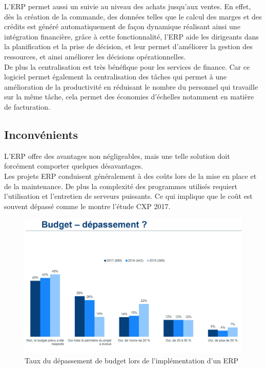         L’ERP permet aussi un suivie au niveau des achats jusqu’aux ventes. En effet, dès la création de la commande, des données telles que le calcul des marges et des crédits est généré automatiquement de façon dynamique réalisant ainsi une intégration financière, grâce à cette fonctionnalité, l’ERP aide les dirigeants dans la planification et la prise de décision, et leur permet d’améliorer la gestion des ressources, et ainsi améliorer les décisions opérationnelles.\\

        De plus la centralisation est très bénéfique pour les services de finance. Car ce logiciel permet également la centralisation des tâches qui permet à une amélioration de la productivité en réduisant le nombre du personnel qui travaille sur la même tâche, cela permet des économies d’échelles notamment en matière de facturation.

    \subsection{Inconvénients}
        L’ERP offre des avantages non négligeables, mais une telle solution doit forcément comporter quelques désavantages.\\

        Les projets ERP conduisent généralement à des coûts lors de la mise en place et de la maintenance. De plus la complexité des programmes utilisés requiert l’utilisation et l’entretien de serveurs puissants. Ce qui implique que le coût est souvent dépassé comme le montre l’étude CXP 2017.\\

        \begin{figure}[H]
            \centering
                \includegraphics[scale=0.4]{chapitre2/graph-depassement-budget.jpg}
            \caption{Taux du dépassement de budget lors de l’implémentation d’un ERP}
        \end{figure} 

